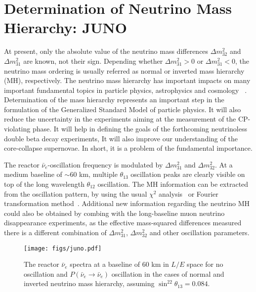 \newcommand{\fixit}[1]{{\color{red}FIXIT: #1}}
\section{Determination of Neutrino Mass Hierarchy: JUNO}

At present, only the absolute value of the neutrino mass differences $\Delta m^2_{32}$ and $\Delta m^2_{31}$ are known, not their sign. Depending whether $\Delta m^2_{31}>0$ or $\Delta m^2_{31}<0$, the neutrino mass ordering is usually referred as normal or inverted mass hierarchy (MH), respectively. The neutrino mass hierarchy has important impacts on many important fundamental topics in particle physics, astrophysics and cosmology ~\cite{MHwhitepaper}. Determination of the mass hierarchy represents an important step in the formulation of the Generalized Standard Model of particle physics. It will also reduce the uncertainty in the experiments aiming at the measurement of the CP-violating phase. It will help in defining the goals of the forthcoming neutrinoless double beta decay experiments, It will also improve our understanding of the core-collapse supernovae. In short, it is a problem of the fundamental importance.

The reactor $\bar\nu_e$-oscillation frequency is modulated by $\Delta m^2_{31}$ and $\Delta m^2_{32}$. At a medium baseline of $\sim$60 km, multiple $\theta_{13}$ oscillation peaks are clearly visible on top of the long wavelength $\theta_{12}$ oscillation.
The MH information can be extracted from the oscillation pattern, by using the usual $\chi^2$ analysis~\cite{Li-PRD13} or Fourier transformation method~\cite{Zhan-PRD08,Zhan-PRD09}. Additional new information regarding the neutrino MH could also be obtained by combing with the long-baseline muon neutrino disappearance experiments, as the effective mass-squared differences measured there is a different combination of $\Delta m^2_{31}$, $\Delta m^2_{32}$ and other oscillation parameters.

\begin{figure}[!htb] \label{fig:juno}
  \centering
  \texttt{[image: figs/juno.pdf]}
  \caption{The reactor $\bar\nu_e$ spectra at a baseline of 60 km in $L/E$ space for no oscillation and $P(\bar\nu_e\to\bar\nu_e)$ oscillation in the cases of normal and inverted neutrino mass hierarchy, assuming $\sin^22\theta_{13}=0.084$.}
\end{figure}

